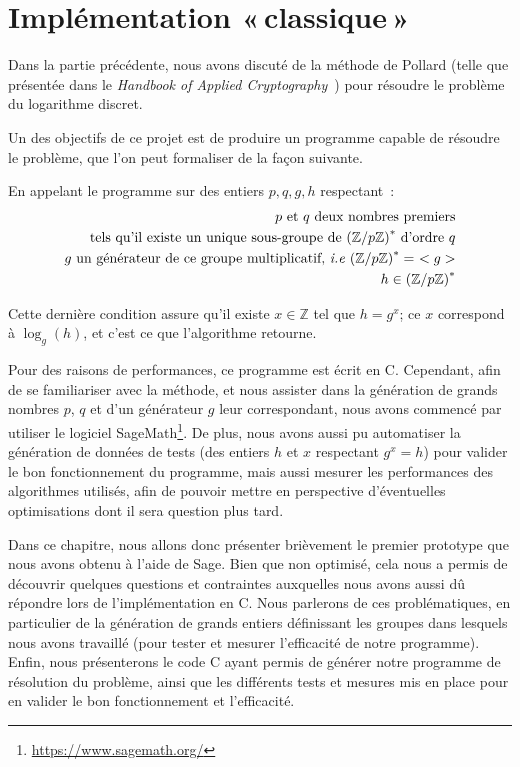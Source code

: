 \chapter{Implémentation «\texorpdfstring{\,}{\ }classique\texorpdfstring{\,}{\ }»}
    Dans la partie précédente, nous avons discuté de la méthode de Pollard (telle que présentée dans le \textit{Handbook of Applied Cryptography}~\autocite[106]{handbook}) pour résoudre le problème du logarithme discret.

    Un des objectifs de ce projet est de produire un programme capable de résoudre le problème, que l'on peut formaliser de la façon suivante.

    En appelant le programme sur des entiers $p, q, g, h$ respectant~:
    \begin{equation} \label{eq:2}
      \begin{split}
        p \text{\ et } q \text{\ deux nombres premiers} \\
        \text{tels qu'il existe un unique sous-groupe de } {(\mathbb{Z}/p\mathbb{Z})}^* \text{\ d'ordre } q \\
        g \text{\ un générateur de ce groupe multiplicatif, \textit{i.e} } {(\mathbb{Z}/p\mathbb{Z})}^* =\ < g > \\
        h \in {(\mathbb{Z}/p\mathbb{Z})}^*
      \end{split}
    \end{equation}

    Cette dernière condition assure qu'il existe $x \in \mathbb{Z}$ tel que $h = g^x$; ce $x$ correspond à $\log_g(h)$, et c'est ce que l'algorithme retourne.

    Pour des raisons de performances, ce programme est écrit en C.
    Cependant, afin de se familiariser avec la méthode, et nous assister dans la génération de grands nombres $p$, $q$ et d'un générateur $g$ leur correspondant, nous avons commencé par utiliser le logiciel SageMath\footnote{\url{https://www.sagemath.org/}}. De plus, nous avons aussi pu automatiser la génération de données de tests (des entiers $h$ et $x$ respectant $g^x = h$) pour valider le bon fonctionnement du programme, mais aussi mesurer les performances des algorithmes utilisés, afin de pouvoir mettre en perspective d'éventuelles optimisations dont il sera question plus tard.

    Dans ce chapitre, nous allons donc présenter brièvement le premier prototype que nous avons obtenu à l'aide de Sage.
    Bien que non optimisé, cela nous a permis de découvrir quelques questions et contraintes auxquelles nous avons aussi dû répondre lors de l'implémentation en C.
    Nous parlerons de ces problématiques, en particulier de la génération de grands entiers définissant les groupes dans lesquels nous avons travaillé (pour tester et mesurer l'efficacité de notre programme).
    Enfin, nous présenterons le code C ayant permis de générer notre programme de résolution du problème, ainsi que les différents tests et mesures mis en place pour en valider le bon fonctionnement et l'efficacité.


